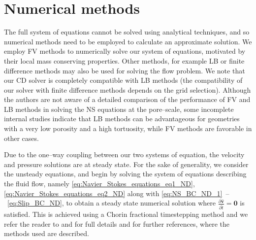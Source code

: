 \documentclass[preprint, 1p, authoryear]{elsarticle}
\begin{document}
\section{Numerical methods}
\label{sec:numerical_methods}
The full system of equations cannot be solved using analytical techniques, and so numerical methods need to be employed to calculate an approximate solution. 
 We employ FV methods to numerically solve our system of equations, motivated by their  local mass conserving properties. Other methods, for example   LB  or finite 
difference methods may also be used for solving the flow problem.  We note that our  CD  solver is completely compatible with LB methods (the compatibility of our solver with  finite difference methods depends on the grid selection). Although the authors are not aware of a detailed 
comparison of the performance of FV  and LB methods  in  solving the NS equations at  the pore--scale,  some 
incomplete internal studies indicate that LB methods can be advantageous for geometries with a very low porosity and a high tortuosity,  while  FV  methods
are favorable in  other cases.
 
Due to the one--way coupling between our two systems of equation,  the velocity and pressure solutions are  at steady state. For the sake of  generality, we consider the unsteady equations, and begin by solving the system of equations describing the fluid flow, namely \eqref{eq:Navier_Stokes_equations_eq1_ND}, \eqref{eq:Navier_Stokes_equations_eq2_ND} along with \eqref{eq:NS_BC_ND_1}~--~\eqref{eq:Slip_BC_ND},  to obtain a steady state numerical solution where  $\displaystyle \frac{\partial \hat{\mathbf{v}}}{\partial \hat{t}} = \mathbf{0}$ is satisfied. This is achieved using a Chorin fractional timestepping method and we refer the reader to \citet{Ciegis2007On} and \citet{Lakdawala2010phd} for full details and for further references, where the methods used are  described. 
\end{document}
